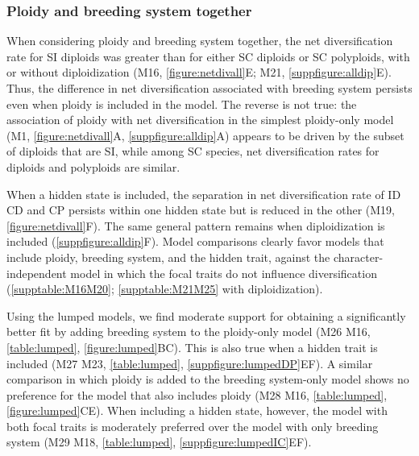 \subsubsection{Ploidy and breeding system together}

When considering ploidy and breeding system together, the net diversification rate for SI diploids was greater than for either SC diploids or SC polyploids, with or without diploidization (M16, \cref{figure:netdivall}E; M21, \cref{suppfigure:alldip}E).
Thus, the difference in net diversification associated with breeding system persists even when ploidy is included in the model.
The reverse is not true: the association of ploidy with net diversification in the simplest ploidy-only model (M1, \cref{figure:netdivall}A, \cref{suppfigure:alldip}A) appears to be driven by the subset of diploids that are SI, while among SC species, net diversification rates for diploids and polyploids are similar.

When a hidden state is included, the separation in net diversification rate of ID \vs CD and CP persists within one hidden state but is reduced in the other (M19, \cref{figure:netdivall}F).
The same general pattern remains when diploidization is included (\cref{suppfigure:alldip}F).
Model comparisons clearly favor models that include ploidy, breeding system, and the hidden trait, against the character-independent model in which the focal traits do not influence diversification (\cref{supptable:M16M20}; \cref{supptable:M21M25} with diploidization). %

Using the lumped models, we find moderate support for obtaining a significantly better fit by adding breeding system to the ploidy-only model (M26 \vs M16, \cref{table:lumped}, \cref{figure:lumped}BC).
This is also true when a hidden trait is included (M27 \vs M23, \cref{table:lumped}, \cref{suppfigure:lumpedDP}EF).
A similar comparison in which ploidy is added to the breeding system-only model shows no preference for the model that also includes ploidy (M28 \vs M16, \cref{table:lumped}, \cref{figure:lumped}CE).
When including a hidden state, however, the model with both focal traits is moderately preferred over the model with only breeding system (M29 \vs M18, \cref{table:lumped}, \cref{suppfigure:lumpedIC}EF).

